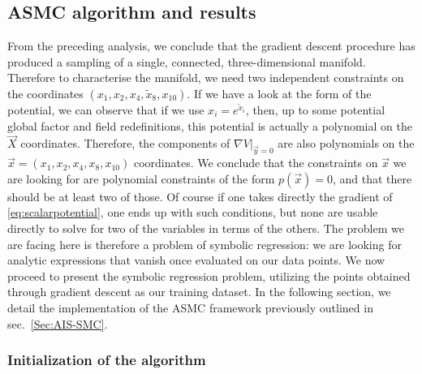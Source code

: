 \documentclass[11pt,a4paper]{article}
\begin{document}
	\subsection{ASMC algorithm and results}  \label{sec:AIS-SMC_application}
	From the preceding analysis, we conclude that the gradient descent procedure has produced a sampling of a single, connected, three-dimensional manifold. Therefore to characterise the manifold, we need two independent constraints on the coordinates $(x_1,x_2,x_4,\tilde{x}_8,x_{10})$. If we have a look at the form of the potential, we can observe that if we use $x_{i} = e^{\tilde{x}_i}$, then, up to some potential global factor and field redefinitions, this potential is actually a polynomial on the $\vec{X}$ coordinates. Therefore, the components of $\left.\nabla V\right|_{\vec{y}=0}$ are also polynomials on the $\vec{x} = (x_1,x_2,x_4,x_8,x_{10})$ coordinates. We conclude that the constraints on $\vec{x}$ we are looking for are polynomial constraints of the form $p(\vec{x}) = 0$, and that there should be at least two of those. Of course if one takes directly the gradient of \eqref{eq:scalarpotential}, one ends up with such conditions, but none are usable directly to solve for two of the variables in terms of the others. The problem we are facing here is therefore a problem of symbolic regression: we are looking for analytic expressions that vanish once evaluated on our data points. We now proceed to present the symbolic regression problem, utilizing the points obtained through gradient descent as our training dataset. In the following section, we detail the implementation of the ASMC framework previously outlined in sec.~\ref{Sec:AIS-SMC}.
	
	
	\subsubsection{Initialization of the algorithm}
	
\end{document}

